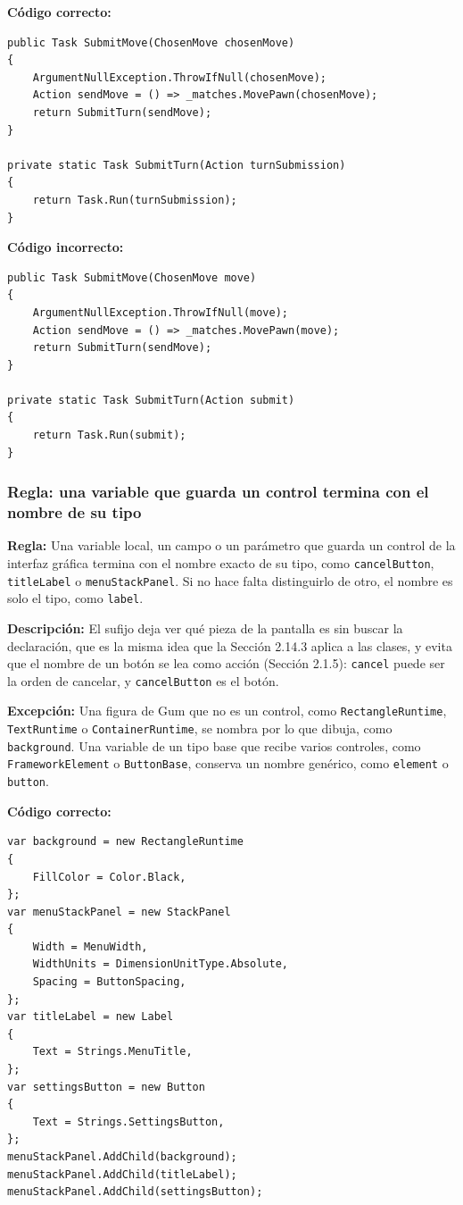 \textbf{Código correcto:}
\begin{lstlisting}[style=csharpstyle]
public Task SubmitMove(ChosenMove chosenMove)
{
    ArgumentNullException.ThrowIfNull(chosenMove);
    Action sendMove = () => _matches.MovePawn(chosenMove);
    return SubmitTurn(sendMove);
}

private static Task SubmitTurn(Action turnSubmission)
{
    return Task.Run(turnSubmission);
}
\end{lstlisting}

\textbf{Código incorrecto:}
\begin{lstlisting}[style=csharpstyle]
public Task SubmitMove(ChosenMove move)
{
    ArgumentNullException.ThrowIfNull(move);
    Action sendMove = () => _matches.MovePawn(move);
    return SubmitTurn(sendMove);
}

private static Task SubmitTurn(Action submit)
{
    return Task.Run(submit);
}
\end{lstlisting}

\subsubsection{Regla: una variable que guarda un control termina con el nombre de su tipo}

\textbf{Regla:} Una variable local, un campo o un parámetro que guarda un control de la interfaz gráfica termina con el nombre exacto de su tipo, como \texttt{cancelButton}, \texttt{titleLabel} o \texttt{menuStackPanel}. Si no hace falta distinguirlo de otro, el nombre es solo el tipo, como \texttt{label}.

\textbf{Descripción:} El sufijo deja ver qué pieza de la pantalla es sin buscar la declaración, que es la misma idea que la Sección 2.14.3 aplica a las clases, y evita que el nombre de un botón se lea como acción (Sección 2.1.5): \texttt{cancel} puede ser la orden de cancelar, y \texttt{cancelButton} es el botón.

\textbf{Excepción:} Una figura de Gum que no es un control, como \texttt{RectangleRuntime}, \texttt{TextRuntime} o \texttt{ContainerRuntime}, se nombra por lo que dibuja, como \texttt{background}. Una variable de un tipo base que recibe varios controles, como \texttt{FrameworkElement} o \texttt{ButtonBase}, conserva un nombre genérico, como \texttt{element} o \texttt{button}.

\textbf{Código correcto:}
\begin{lstlisting}[style=csharpstyle]
var background = new RectangleRuntime
{
    FillColor = Color.Black,
};
var menuStackPanel = new StackPanel
{
    Width = MenuWidth,
    WidthUnits = DimensionUnitType.Absolute,
    Spacing = ButtonSpacing,
};
var titleLabel = new Label
{
    Text = Strings.MenuTitle,
};
var settingsButton = new Button
{
    Text = Strings.SettingsButton,
};
menuStackPanel.AddChild(background);
menuStackPanel.AddChild(titleLabel);
menuStackPanel.AddChild(settingsButton);
\end{lstlisting}


